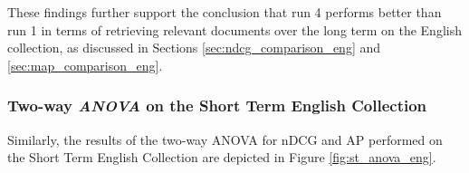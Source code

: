 These findings further support the conclusion that run 4 performs better than run 1 in terms of retrieving relevant documents over the long term on the English collection, as discussed in Sections \ref{sec:ndcg_comparison_eng} and \ref{sec:map_comparison_eng}.



\subsubsection{Two-way \textit{ANOVA} on the Short Term English Collection}

Similarly, the results of the two-way \ac{ANOVA} for \ac{nDCG} and \ac{AP} performed on the Short Term English Collection are depicted in Figure \ref{fig:st_anova_eng}.

